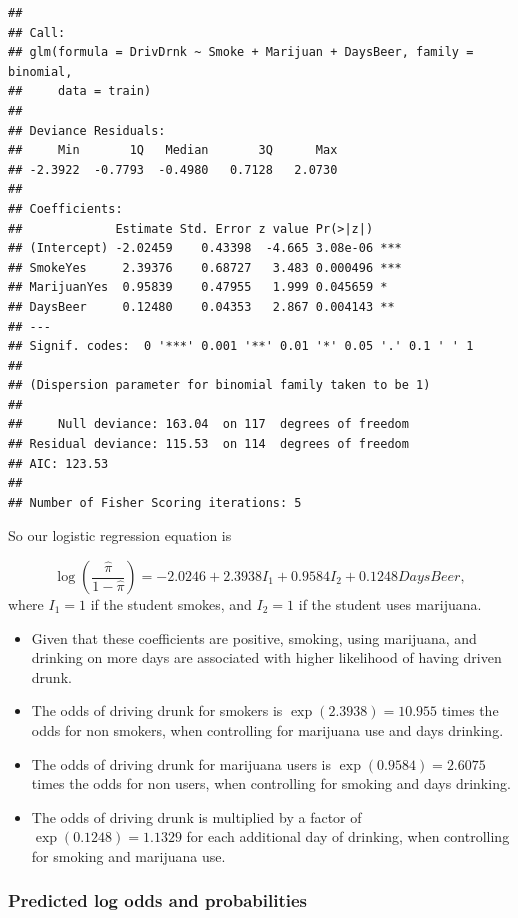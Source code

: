 \documentclass[
]{book}
\providecommand{\tightlist}{%
  \setlength{\itemsep}{0pt}\setlength{\parskip}{0pt}}
\begin{document}
\begin{verbatim}
## 
## Call:
## glm(formula = DrivDrnk ~ Smoke + Marijuan + DaysBeer, family = binomial, 
##     data = train)
## 
## Deviance Residuals: 
##     Min       1Q   Median       3Q      Max  
## -2.3922  -0.7793  -0.4980   0.7128   2.0730  
## 
## Coefficients:
##             Estimate Std. Error z value Pr(>|z|)    
## (Intercept) -2.02459    0.43398  -4.665 3.08e-06 ***
## SmokeYes     2.39376    0.68727   3.483 0.000496 ***
## MarijuanYes  0.95839    0.47955   1.999 0.045659 *  
## DaysBeer     0.12480    0.04353   2.867 0.004143 ** 
## ---
## Signif. codes:  0 '***' 0.001 '**' 0.01 '*' 0.05 '.' 0.1 ' ' 1
## 
## (Dispersion parameter for binomial family taken to be 1)
## 
##     Null deviance: 163.04  on 117  degrees of freedom
## Residual deviance: 115.53  on 114  degrees of freedom
## AIC: 123.53
## 
## Number of Fisher Scoring iterations: 5
\end{verbatim}

So our logistic regression equation is

\[
\log \left( \frac{\hat{\pi}}{1-\hat{\pi}}   \right) = -2.0246 + 2.3938I_1 + 0.9584I_2 + 0.1248 DaysBeer,
\]
where \(I_1 = 1\) if the student smokes, and \(I_2 = 1\) if the student uses marijuana.

\begin{itemize}
\tightlist
\item
  Given that these coefficients are positive, smoking, using marijuana, and drinking on more days are associated with higher likelihood of having driven drunk.
\item
  The odds of driving drunk for smokers is \(\exp(2.3938) = 10.955\) times the odds for non smokers, when controlling for marijuana use and days drinking.
\item
  The odds of driving drunk for marijuana users is \(\exp(0.9584) = 2.6075\) times the odds for non users, when controlling for smoking and days drinking.
\item
  The odds of driving drunk is multiplied by a factor of \(\exp(0.1248) = 1.1329\) for each additional day of drinking, when controlling for smoking and marijuana use.
\end{itemize}

\hypertarget{predicted-log-odds-and-probabilities}{%
\subsubsection*{Predicted log odds and probabilities}\label{predicted-log-odds-and-probabilities}}
\end{document}
